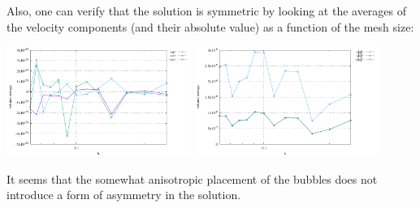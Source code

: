 Also, one can verify that the solution is symmetric by looking at the averages of the 
velocity components (and their absolute value) as a function of the mesh size:
\begin{center}
\includegraphics[width=6cm]{python_codes/fieldstone_82/results/bench4/averages.pdf}
\includegraphics[width=6cm]{python_codes/fieldstone_82/results/bench4/averages_abs.pdf}
\end{center}
It seems that the somewhat anisotropic placement of the bubbles does not introduce 
a form of asymmetry in the solution.

